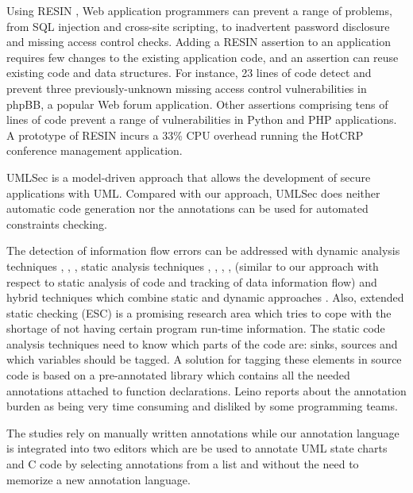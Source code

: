 Using RESIN \cite{ref_63_yip2009improving}, Web application programmers can prevent a range
of problems, from SQL injection and cross-site scripting, to inadvertent password disclosure and missing access control checks. Adding
a RESIN assertion to an application requires few changes to the
existing application code, and an assertion can reuse existing code
and data structures. For instance, 23 lines of code detect and prevent
three previously-unknown missing access control vulnerabilities in
phpBB, a popular Web forum application. Other assertions comprising tens of lines of code prevent a range of vulnerabilities in Python
and PHP applications. A prototype of RESIN incurs a 33\% CPU
overhead running the HotCRP conference management application.

UMLSec \cite{ref_33_juerjens:secure} is a model-driven approach that allows the
development of secure applications with UML. Compared with
our approach, UMLSec does neither automatic code
generation nor the annotations can be used for automated
constraints checking.

The detection of information flow errors can be
addressed with dynamic analysis techniques \cite{ref_44_avgerinos:aeg}, \cite{ref_43_fenton:memoryless}, \cite{ref_42_sabelfeld:dynamic},
static analysis techniques \cite{ref_41_guarnieri:security}, \cite{ref_40_myers:jflow}, \cite{ref_39_simonet:report}, \cite{ref_38_volpano:sound}, \cite{ref_37_xiao:transparent} (similar
to our approach with respect to static analysis of code and
tracking of data information flow) and hybrid techniques which
combine static and dynamic approaches \cite{ref_36_moore:static}. Also, extended
static checking \cite{ref_35_david:extended} (ESC) is a promising research area which
tries to cope with the shortage of not having certain program
run-time information.
The static code analysis techniques need to know which
parts of the code are: sinks, sources and which variables
should be tagged. A solution for tagging these elements in
source code is based on a pre-annotated library which contains
all the needed annotations attached to function declarations.
Leino \cite{ref_34_leino:10years} reports about the annotation burden as being very
time consuming and disliked by some programming teams.

 The studies rely on manually
written annotations while our annotation language is integrated
into two editors which are be used to annotate UML state
charts and C code by selecting annotations from a list and
without the need to memorize a new annotation language.

